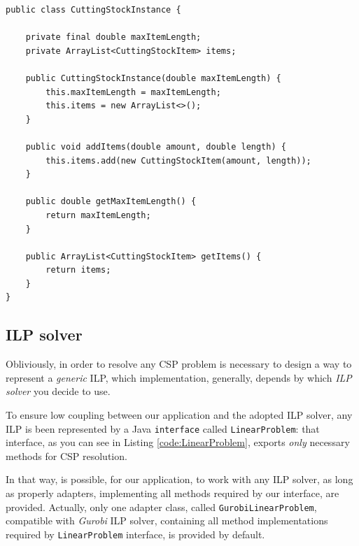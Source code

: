 \documentclass[10pt,a4paper]{article}
\begin{document}
\begin{lstlisting}[frame=lines, caption={\texttt{CuttingStockInstance} class implementation.}, label={code:instance}]
public class CuttingStockInstance {

    private final double maxItemLength;
    private ArrayList<CuttingStockItem> items;

    public CuttingStockInstance(double maxItemLength) {
        this.maxItemLength = maxItemLength;
        this.items = new ArrayList<>();
    }

    public void addItems(double amount, double length) {
        this.items.add(new CuttingStockItem(amount, length));
    }

    public double getMaxItemLength() {
        return maxItemLength;
    }

    public ArrayList<CuttingStockItem> getItems() {
        return items;
    }
}
\end{lstlisting}

\subsection{ILP solver}

Obliviously, in order to resolve any CSP problem is necessary to design a way to represent a \textit{generic} ILP, which implementation, generally, depends by which \textit{ILP solver} you decide to use.

To ensure low coupling between our application and the adopted ILP solver, any ILP is been represented by a Java \texttt{interface} called \texttt{LinearProblem}: that interface, as you can see in Listing \ref{code:LinearProblem}, exports \textit{only} necessary methods for CSP resolution.

In that way, is possible, for our application, to work with any ILP solver, as long as properly adapters, implementing all methods required by our interface, are provided. Actually, only one adapter class, called \texttt{GurobiLinearProblem}, compatible with \textit{Gurobi} ILP solver, containing all method implementations required by \texttt{LinearProblem} interface, is provided by default.
\end{document}
